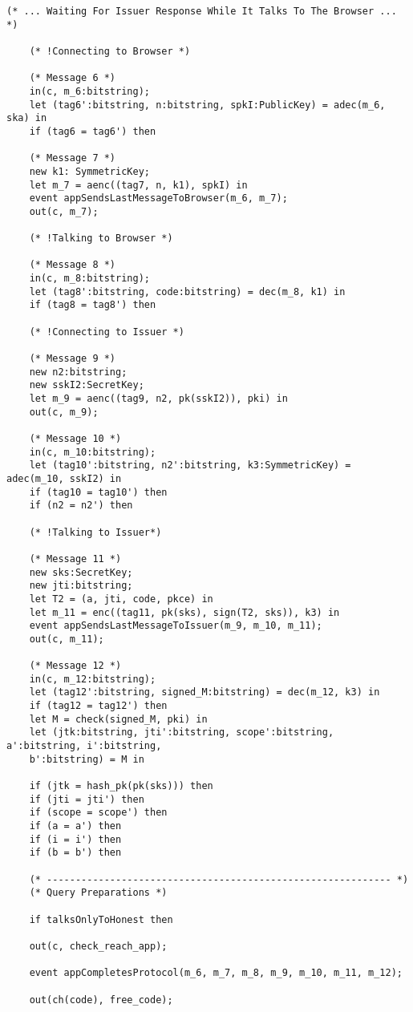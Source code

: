 \begin{Verbatim}[fontsize=\small]
    (* ... Waiting For Issuer Response While It Talks To The Browser ... *)

    (* !Connecting to Browser *)

    (* Message 6 *)
    in(c, m_6:bitstring);
    let (tag6':bitstring, n:bitstring, spkI:PublicKey) = adec(m_6, ska) in
    if (tag6 = tag6') then

    (* Message 7 *)
    new k1: SymmetricKey;
    let m_7 = aenc((tag7, n, k1), spkI) in
    event appSendsLastMessageToBrowser(m_6, m_7);
    out(c, m_7);

    (* !Talking to Browser *)

    (* Message 8 *)
    in(c, m_8:bitstring);
    let (tag8':bitstring, code:bitstring) = dec(m_8, k1) in
    if (tag8 = tag8') then

    (* !Connecting to Issuer *)
 
    (* Message 9 *)
    new n2:bitstring;
    new sskI2:SecretKey;
    let m_9 = aenc((tag9, n2, pk(sskI2)), pki) in
    out(c, m_9);

    (* Message 10 *)
    in(c, m_10:bitstring);
    let (tag10':bitstring, n2':bitstring, k3:SymmetricKey) = adec(m_10, sskI2) in
    if (tag10 = tag10') then
    if (n2 = n2') then

    (* !Talking to Issuer*)

    (* Message 11 *)
    new sks:SecretKey;
    new jti:bitstring;
    let T2 = (a, jti, code, pkce) in
    let m_11 = enc((tag11, pk(sks), sign(T2, sks)), k3) in
    event appSendsLastMessageToIssuer(m_9, m_10, m_11);
    out(c, m_11);

    (* Message 12 *)
    in(c, m_12:bitstring);
    let (tag12':bitstring, signed_M:bitstring) = dec(m_12, k3) in
    if (tag12 = tag12') then
    let M = check(signed_M, pki) in
    let (jtk:bitstring, jti':bitstring, scope':bitstring, a':bitstring, i':bitstring, 
    b':bitstring) = M in

    if (jtk = hash_pk(pk(sks))) then
    if (jti = jti') then
    if (scope = scope') then
    if (a = a') then
    if (i = i') then
    if (b = b') then

    (* ------------------------------------------------------------ *)
    (* Query Preparations *)

    if talksOnlyToHonest then

    out(c, check_reach_app);

    event appCompletesProtocol(m_6, m_7, m_8, m_9, m_10, m_11, m_12);

    out(ch(code), free_code);


\end{Verbatim}
